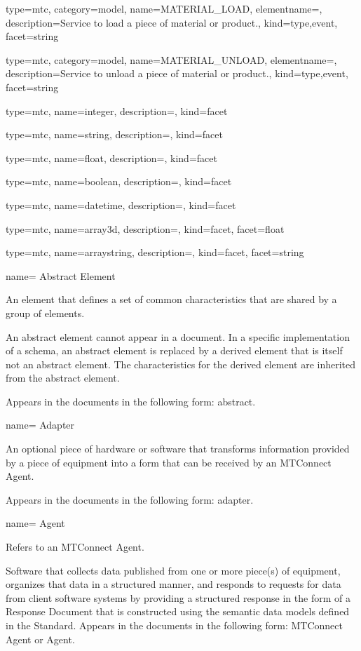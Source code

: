 {
  type=mtc,
  category=model,
  name={MATERIAL\_LOAD},
  elementname=,
  description={Service to load a piece of material or product.},
  kind={type,event},
  facet={\gls{string}}
}


{
  type=mtc,
  category=model,
  name={MATERIAL\_UNLOAD},
  elementname=,
  description={Service to unload a piece of material or product.},
  kind={type,event},
  facet={\gls{string}}
}


{
  type=mtc,
  name={integer},
  description={},
  kind={facet}
}


{
  type=mtc,
  name={string},
  description={},
  kind={facet}
}


{
  type=mtc,
  name={float},
  description={},
  kind={facet}
}


{
  type=mtc,
  name={boolean},
  description={},
  kind={facet}
}


{
  type=mtc,
  name={datetime},
  description={},
  kind={facet}
}


{
  type=mtc,
  name={array3d},
  description={},
  kind={facet},
  facet={\gls{float}}
}

{
  type=mtc,
  name={arraystring},
  description={},
  kind={facet},
  facet={\gls{string}}
}

{
  name= {Abstract Element}
}
{
  An element that defines a set of common characteristics that are shared by a group of elements.
  
  An abstract element cannot appear in a document. In a specific implementation of a schema, an abstract element is replaced by a derived element that is itself not an abstract element. The characteristics for the derived element are inherited from the abstract element. 
  
  Appears in the documents in the following form: abstract.
}


{
  name= {Adapter}
}
{
  An optional piece of hardware or software that transforms information provided by a piece of equipment into a form that can be received by an MTConnect Agent.

  Appears in the documents in the following form: adapter.
}


{
  name= {Agent}
}
{
  Refers to an MTConnect Agent. 
  
  Software that collects data published from one or more piece(s) of equipment, organizes that data in a structured manner, and responds to requests for data from client software systems by providing a structured response in the form of a Response Document that is constructed using the semantic data models defined in the Standard. 
  Appears in the documents in the following form: MTConnect Agent or Agent.
}


